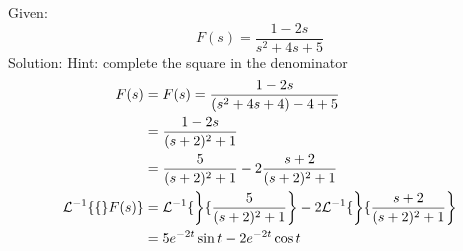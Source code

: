 \documentclass[diffeq.tex]{subfiles}
\begin{document}
\begin{homework*}[255.7]
    Given:
    \begin{equation}
        F(s) = \frac{1 - 2s}{s^{2} + 4s + 5}
    \end{equation}
    Solution:
    Hint: complete the square in the denominator
    \begin{alignat}{1}
        F(s) &= F(s) = \frac{1 - 2s}{(s^{2} + 4s + 4) - 4 + 5}\\
        &= \frac{1 - 2s}{(s + 2)^{2} + 1}\\
        &= \frac{5}{(s + 2)^{2} + 1} - 2 \frac{s + 2}{(s + 2)^{2} + 1}\\
        \mathcal{L}^{-1}\{\{\}F(s)\} &= \mathcal{L}^{-1}\{\left\}\{\frac{5}{(s + 2)^{2} + 1}\right\} - 2\mathcal{L}^{-1}\{\left\}\{\frac{s + 2}{(s + 2)^{2} + 1}\right\}\\
        &= 5e^{-2t}\sin t - 2e^{-2t}\cos t
    \end{alignat}
\end{homework*}
\np
\end{document}
